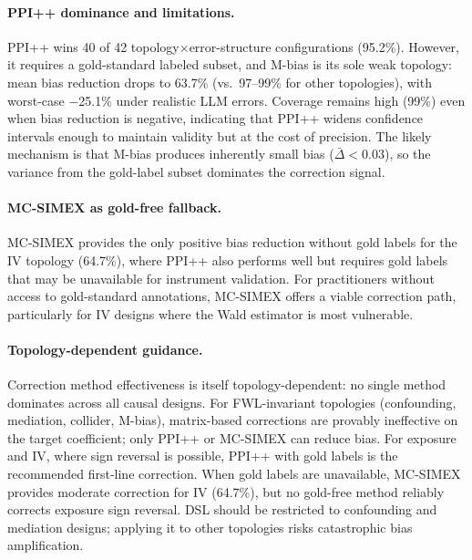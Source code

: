 \paragraph{PPI++ dominance and limitations.}
PPI++ wins 40 of 42 topology$\times$error-structure configurations (95.2\%). However, it requires a gold-standard labeled subset, and M-bias is its sole weak topology: mean bias reduction drops to 63.7\% (vs.\ 97--99\% for other topologies), with worst-case $-$25.1\% under realistic LLM errors. Coverage remains high (99\%) even when bias reduction is negative, indicating that PPI++ widens confidence intervals enough to maintain validity but at the cost of precision. The likely mechanism is that M-bias produces inherently small bias ($\bar{\Delta}{<}0.03$), so the variance from the gold-label subset dominates the correction signal.

\paragraph{MC-SIMEX as gold-free fallback.}
MC-SIMEX provides the only positive bias reduction without gold labels for the IV topology (64.7\%), where PPI++ also performs well but requires gold labels that may be unavailable for instrument validation. For practitioners without access to gold-standard annotations, MC-SIMEX offers a viable correction path, particularly for IV designs where the Wald estimator is most vulnerable.

\paragraph{Topology-dependent guidance.}
Correction method effectiveness is itself topology-dependent: no single method dominates across all causal designs. For FWL-invariant topologies (confounding, mediation, collider, M-bias), matrix-based corrections are provably ineffective on the target coefficient; only PPI++ or MC-SIMEX can reduce bias. For exposure and IV, where sign reversal is possible, PPI++ with gold labels is the recommended first-line correction. When gold labels are unavailable, MC-SIMEX provides moderate correction for IV (64.7\%), but no gold-free method reliably corrects exposure sign reversal. DSL should be restricted to confounding and mediation designs; applying it to other topologies risks catastrophic bias amplification.

